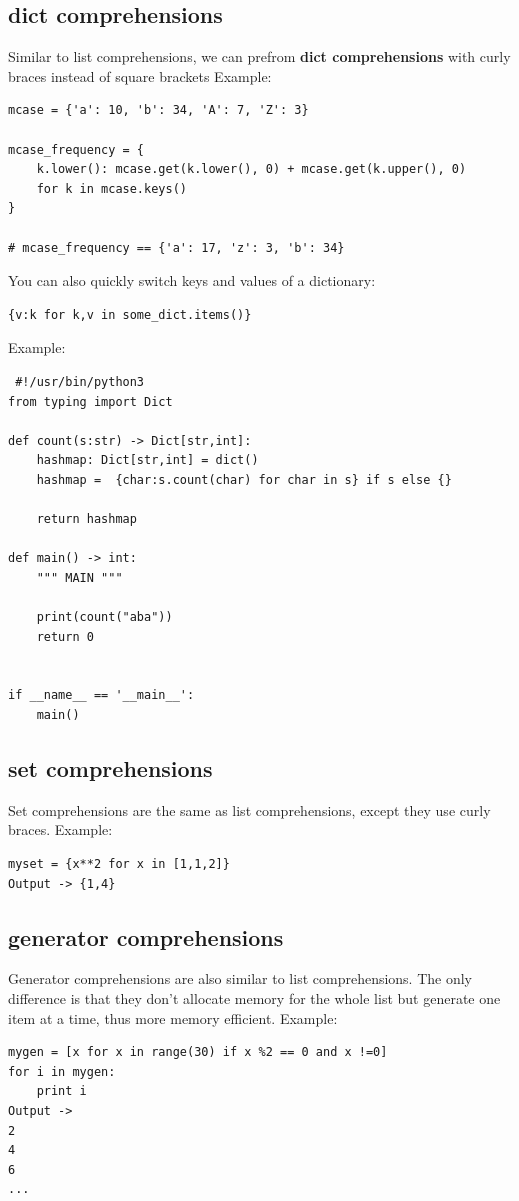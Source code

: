 \documentclass{report}
\begin{document}
    \subsection{dict comprehensions}
    \bigbreak \noindent
    Similar to list comprehensions, we can prefrom \textbf{dict comprehensions} with curly braces instead of square brackets
    \bigbreak \noindent 
    Example:
    \begin{verbatim}
mcase = {'a': 10, 'b': 34, 'A': 7, 'Z': 3}

mcase_frequency = {
    k.lower(): mcase.get(k.lower(), 0) + mcase.get(k.upper(), 0)
    for k in mcase.keys()
}

# mcase_frequency == {'a': 17, 'z': 3, 'b': 34}
    \end{verbatim}
    \bigbreak \noindent 
     You can also quickly switch keys and values of a dictionary:
     \begin{verbatim}
{v:k for k,v in some_dict.items()}
     \end{verbatim}
     Example:
     \begin{verbatim}
 #!/usr/bin/python3
from typing import Dict

def count(s:str) -> Dict[str,int]:
    hashmap: Dict[str,int] = dict()
    hashmap =  {char:s.count(char) for char in s} if s else {}

    return hashmap

def main() -> int:
    """ MAIN """

    print(count("aba"))
    return 0


if __name__ == '__main__':
    main()
     \end{verbatim}



     \pagebreak \bigbreak \noindent
    \subsection{set comprehensions}
    \bigbreak \noindent
    Set comprehensions are the same as list comprehensions, except they use curly braces.
    \bigbreak \noindent 
    Example:
    \begin{verbatim}
myset = {x**2 for x in [1,1,2]}
Output -> {1,4}
    \end{verbatim}


    \subsection{generator comprehensions}
    \bigbreak \noindent
    Generator comprehensions are also similar to list comprehensions. The only difference is that they don’t allocate memory for the whole list but generate one item at a time, thus more memory efficient.
    \bigbreak \noindent 
    Example:
    \begin{verbatim}
mygen = [x for x in range(30) if x %2 == 0 and x !=0]
for i in mygen:
    print i
Output ->
2
4
6
...
    \end{verbatim}
\end{document}
